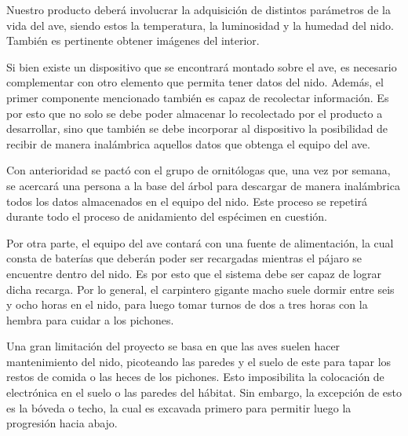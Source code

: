 


Nuestro producto deberá involucrar la adquisición de distintos parámetros de la vida del ave, siendo estos la temperatura, la luminosidad y la humedad del nido. También es pertinente obtener imágenes del interior. 

Si bien existe un dispositivo que se encontrará montado sobre el ave, es necesario complementar con otro elemento que permita tener datos del nido. Además, el primer componente mencionado también es capaz de recolectar información. Es por esto que no solo se debe poder almacenar lo recolectado por el producto a desarrollar, sino que también se debe incorporar al dispositivo la posibilidad de recibir de manera inalámbrica aquellos datos que obtenga el equipo del ave. 

Con anterioridad se pactó con el grupo de ornitólogas que, una vez por semana, se acercará una persona a la base del árbol para descargar de manera inalámbrica todos los datos almacenados en el equipo del nido. Este proceso se repetirá durante todo el proceso de anidamiento del espécimen en cuestión.

Por otra parte, el equipo del ave contará con una fuente de alimentación, la cual consta de baterías que deberán poder ser recargadas mientras el pájaro se encuentre dentro del nido. Es por esto que el sistema debe ser capaz de lograr dicha recarga. Por lo general, el carpintero gigante macho suele dormir entre seis y ocho horas en el nido, para luego tomar turnos de dos a tres horas con la hembra para cuidar a los pichones.

Una gran limitación del proyecto se basa en que las aves suelen hacer mantenimiento del nido, picoteando las paredes y el suelo de este para tapar los restos de comida o las heces de los pichones. Esto imposibilita la colocación de electrónica en el suelo o las paredes del hábitat. Sin embargo, la excepción de esto es la bóveda o techo, la cual es excavada primero para permitir luego la progresión hacia abajo.

